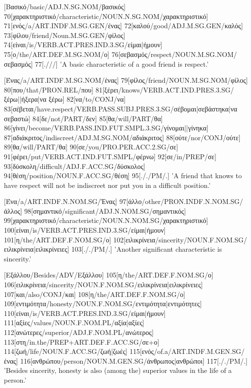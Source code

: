 \documentclass[extrafontsizes,17pt]{memoir}
\begin{document}
\a

[Βασικό/basic/ADJ.N.SG.NOM/βασικός]
70[χαρακτηριστικό/characteristic/NOUN.N.SG.NOM/χαρακτηριστικό]
71[ενός/a/ART.INDF.M.SG.GEN/ένας] 
72[καλού/good/ADJ.M.SG.GEN/καλός] 
73[φίλου/friend/Noun.M.SG.GEN/φίλος] 
74[είναι/is/VERB.ACT.PRES.IND.3.SG/είμαι|ήμουν] 
75[ο/the/ART.DEF.M.SG.NOM/ο] 
76[σεβασμός/respect/NOUN.M.SG.NOM/σεβασμός]
77[.///] 
\glft 
'A basic characteristic of a good friend is respect.'
\endgl

\a

[Ένας/a/ART.INDF.M.SG.NOM/ένας]
79[φίλος/friend/NOUN.M.SG.NOM/φίλος] 
80[που/that/PRON.REL/που] 
81[ξέρει/knows/VERB.ACT.IND.PRES.3.SG/ξέρω||ήξερα|να ξέρω] 
82[να/to/CONJ/να] 
83[σέβεται/have.respect/VERB.PASS.SUBJ.PRES.3.SG/σέβομαι|σεβάστηκα|να σεβαστώ] 
84[δε/not/PART/δεν] 
85[θα/will/PART/θα] 
86[γίνει/become/VERB.PASS.IND.FUT.SMPL.3.SG/γίνομαι||γίνηκα] 
87[αδιάκριτος/indiscreet/ADJ.M.SG.NOM/αδιάκριτος]
88[ούτε/nor/CONJ/ούτε] 
89[θα/will/PART/θα] 
90[σε/you/PRO.PER.ACC.2.SG/σε] 
91[φέρει/put/VERB.ACT.IND.FUT.SMPL/φέρνω] 
92[σε/in/PREP/σε] 
93[δύσκολη/difficult/ADJ.F.ACC.SG/δύσκολος] 
94[θέση/position/NOUN.F.ACC.SG/θέση]
95[././PM/.] 
\glft 
'A friend that knows to have respect will not be indiscreet nor put you in a difficult position.'
\endgl

\a

[Ένα/a/ART.INDF.N.NOM.SG/Ἐνας]
97[άλλο/other/PRON.INDF.N.NOM.SG/άλλος]
98[σημαντικό/significant/ADJ.N.NOM.SG/σημαντικός]
99[χαρακτηριστικό/characteristic/NOUN.N.NOM.SG/χαρακτηριστικό]
100[είναι/is/VERB.ACT.PRES.IND.3.SG/είμαι|ήμουν] 
101[η/the/ART.DEF.F.NOM.SG/ο]
102[ειλικρίνεια/sincerity/NOUN.F.NOM.SG/ειλικρίνεια|ειλικρίνειες]
103[././PM/.]
\glft 
'Another significant characteristic is sincerity.'
\endgl

\a

[Εξάλλου/Besides/ADV/Εξάλλου] 
105[η/the/ART.DEF.F.NOM.SG/ο]
106[ειλικρίνεια/sincerity/NOUN.F.NOM.SG/ειλικρίνεια|ειλικρίνειες]
107[και/also/CONJ/και]
108[η/the/ART.DEF.F.NOM.SG/ο]
109[εντιμότητα/honesty/NOUN.F.NOM.SG/εντιμότητα|εντιμότητες]
110[είναι/is/VERB.ACT.PRES.IND.3.SG/είμαι|ήμουν]
111[αξίες/values/NOUN.F.NOM.PL/αξία|αξίες]
112[ανώτερες/superior/ADJ.F.NOM.PL/ανώτερος]
113[στη/in.the/PREP+ART.DEF.F.ACC.SG/σε+ο]
114[ζωή/life/NOUN.F.ACC.SG/ζωή|ζωές]
115[ενός/of.a/ART.INDF.M.GEN.SG/ένας]
116[ανθρώπου/person/NOUN.M.GEN.SG/άνθρωπος|ανθρώποι]
117[././PM/.]
\glft 
'Besides sincerity, honesty is also (among the) superior values in the life of a person.'
\endgl
\end{document}
